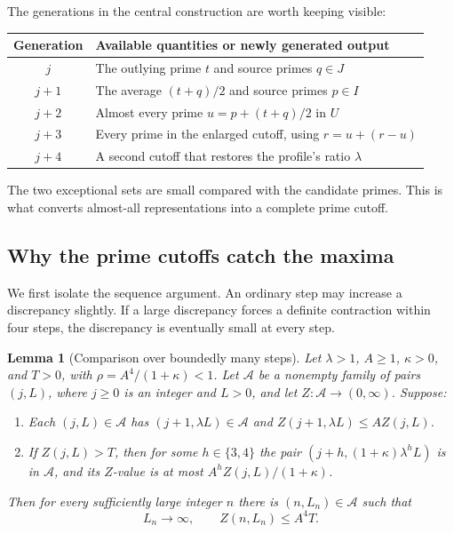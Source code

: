 \documentclass[11pt,letterpaper]{article}
\numberwithin{equation}{section}
\newtheorem{lemma}[theorem]{Lemma}
\theoremstyle{definition}
\theoremstyle{remark}
\begin{document}
The generations in the central construction are worth keeping visible:
\begin{center}
\begin{tabular}{@{}cl@{}}
\toprule
Generation & Available quantities or newly generated output\\
\midrule
$j$ & The outlying prime $t$ and source primes $q\in J$\\
$j+1$ & The average $(t+q)/2$ and source primes $p\in I$\\
$j+2$ & Almost every prime $u=p+(t+q)/2$ in $U$\\
$j+3$ & Every prime in the enlarged cutoff, using $r=u+(r-u)$\\
$j+4$ & A second cutoff that restores the profile's ratio $\lambda$\\
\bottomrule
\end{tabular}
\end{center}
The two exceptional sets are small compared with the candidate primes.
This is what converts almost-all representations into a complete prime cutoff.

\begin{samepage}
\section{Why the prime cutoffs catch the maxima}
\label{sec:comparison}

We first isolate the sequence argument. An ordinary step may increase a
discrepancy slightly. If a large discrepancy forces a definite contraction
within four steps, the discrepancy is eventually small at every step.

\begin{lemma}[Comparison over boundedly many steps]\label{lem:comparison}
Let $\lambda>1$, $A\ge1$, $\kappa>0$, and $T>0$, with
$\rho=A^4/(1+\kappa)<1$.
Let $\mathcal A$ be a nonempty family of pairs $(j,L)$, where
$j\ge0$ is an integer and $L>0$, and let $Z:\mathcal A\to(0,\infty)$.
Suppose:
\begin{enumerate}[label=\textup{(\roman*)}]
\item Each $(j,L)\in\mathcal A$ has $(j+1,\lambda L)\in\mathcal A$ and
$Z(j+1,\lambda L)\le A Z(j,L)$.
\item If $Z(j,L)>T$, then for some $h\in\{3,4\}$ the pair
$(j+h,(1+\kappa)\lambda^hL)$ is in $\mathcal A$, and its $Z$-value is
at most $A^hZ(j,L)/(1+\kappa)$.
\end{enumerate}
Then for every sufficiently large integer $n$ there is $(n,L_n)\in\mathcal A$
such that
\begin{equation}\label{eq:abstract-comparison}
 L_n\longrightarrow\infty,\qquad Z(n,L_n)\le A^4T.
\end{equation}
\end{lemma}
\end{samepage}
\end{document}
